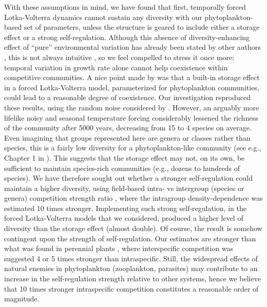 \documentclass[a4paper,12pt]{article}
\begin{document}
With these assumptions in mind, we have found that first, temporally
forced Lotka-Volterra dynamics cannot sustain any diversity with our
phytoplankton-based set of parameters, unless the structure is geared
to include either a storage effect or a strong self-regulation. Although
this absence of diversity-enhancing effect of ``pure'' environmental
variation has already been stated by other authors \citep{chesson_roles_1997,barabas_community_2012,fox_intermediate_2013,scranton_coexistence_2016},
this is not always intuitive \citep{fox_intermediate_2013}, so we
feel compelled to stress it once more: temporal variation in growth
rate alone cannot help coexistence within competitive communities.
A nice point made by \citet{scranton_coexistence_2016} was that a
built-in storage effect in a forced Lotka-Volterra model, parameterized
for phytoplankton communities, could lead to a reasonable degree of
coexistence. Our investigation reproduced these results, using the
random noise considered by \citet{scranton_coexistence_2016}. However,
an arguably more lifelike noisy and seasonal temperature forcing considerably
lessened the richness of the community after 5000 years, decreasing
from 15 to 4 species on average. Even imagining that groups represented
here are genera or classes rather than species, this is a fairly low
diversity for a phytoplankton-like community (see e.g., Chapter 1
in \citealp{reynolds2006ecology}). This suggests that the storage
effect may not, on its own, be sufficient to maintain species-rich
communities (e.g., dozens to hundreds of species). We have therefore
sought out whether a stronger self-regulation could maintain a higher
diversity, using field-based intra- vs intergroup (species or genera)
competition strength ratio \citep{barraquand2018coastal}, where the
intragroup density-dependence was estimated 10 times stronger. Implementing
such strong self-regulation, in the forced Lotka-Volterra models that
we considered, produced a higher level of diversity than the storage
effect (almost double). Of course, the result is somehow contingent
upon the strength of self-regulation. Our estimates are stronger
than what was found in perennial plants \citep{adler_coexistence_2010},
where interspecific competition was suggested 4 or 5 times stronger
than intraspecific. Still, the widespread effects of natural enemies
in phytoplankton (zooplankton, parasites) may contribute to an increase
in the self-regulation strength \citep{barraquand2018coastal,chesson_updates_2018}
relative to other systems, hence we believe that 10 times stronger
intraspecific competition constitutes a reasonable order of magnitude.
\end{document}
